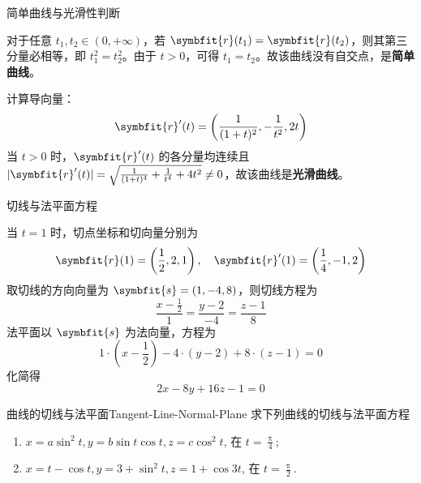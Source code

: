 \begin{solution}
     简单曲线与光滑性判断

    对于任意 $t_1, t_2 \in (0, +\infty)$，若 $\symbfit{r}(t_1) = \symbfit{r}(t_2)$，则其第三分量必相等，即 $t_1^2 = t_2^2$。由于 $t > 0$，可得 $t_1 = t_2$。故该曲线没有自交点，是\textbf{简单曲线}。

    计算导向量：
    \begin{equation}
        \symbfit{r}'(t) = \left( \frac{1}{(1+t)^2}, -\frac{1}{t^2}, 2t \right)
    \end{equation}
    当 $t > 0$ 时，$\symbfit{r}'(t)$ 的各分量均连续且 $|\symbfit{r}'(t)| = \sqrt{\frac{1}{(1+t)^4} + \frac{1}{t^4} + 4t^2} \neq 0$，故该曲线是\textbf{光滑曲线}。

     切线与法平面方程

    当 $t = 1$ 时，切点坐标和切向量分别为
    \begin{equation}
        \symbfit{r}(1) = \left( \frac{1}{2}, 2, 1 \right), \quad \symbfit{r}'(1) = \left( \frac{1}{4}, -1, 2 \right)
    \end{equation}
    取切线的方向向量为 $\symbfit{s} = (1, -4, 8)$，则切线方程为
    \begin{equation}
        \boxed{\frac{x - \frac{1}{2}}{1} = \frac{y - 2}{-4} = \frac{z - 1}{8}}
    \end{equation}
    法平面以 $\symbfit{s}$ 为法向量，方程为
    \begin{equation}
        1 \cdot \left( x - \frac{1}{2} \right) - 4 \cdot (y - 2) + 8 \cdot (z - 1) = 0
    \end{equation}
    化简得
    \begin{equation}
        \boxed{2x - 8y + 16z - 1 = 0}
    \end{equation}
\end{solution}


\begin{problem}{曲线的切线与法平面}{Tangent-Line-Normal-Plane}
    求下列曲线的切线与法平面方程
    \begin{enumerate}
        \item $x = a \sin^2 t, y = b \sin t \cos t, z = c \cos^2 t$, 在 $t = \frac{\uppi}{4}$;
        \item $x = t - \cos t, y = 3 + \sin^2 t, z = 1 + \cos 3t$, 在 $t = \frac{\uppi}{2}$.
    \end{enumerate}
\end{problem}

